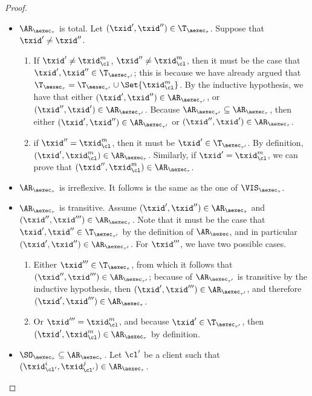 \begin{proof}
\begin{itemize}
\begin{itemize}
\item $\AR_{\aexec_{\tau}}$ is total. Let $(\txid', \txid'') \in \T_{\aexec_{\tau}}$. 
Suppose that $\txid' \neq \txid''$.
\begin{enumerate}
\item If $\txid' \neq 
\txid_{\cl}^{m}$, $\txid'' \neq \txid_{\cl}^{m}$, then it must be the case that $\txid', \txid'' \in \T_{\aexec_{\tau'}}$; 
this is because we have already argued that $\T_{\aexec_{\tau}} = \T_{\aexec_{\tau'}} \cup \Set{\txid_{\cl}^{m}}$. 
By the inductive hypothesis, we have that either $(\txid', \txid'') \in \AR_{\aexec_{\tau'}}$, or 
$(\txid'', \txid') \in \AR_{\aexec_{\tau'}}$. Because $\AR_{\aexec_{\tau'}} \subseteq \AR_{\aexec_{\tau}}$, 
then either $(\txid', \txid'') \in \AR_{\aexec_{\tau'}}$ or $(\txid'', \txid') \in \AR_{\aexec_{\tau}}$. 
\item if $\txid'' = \txid_{\cl}^{m}$, then it must be $\txid' \in \T_{\aexec_{\tau'}}$. By definition, 
$(\txid', \txid_{\cl}^{m}) \in \AR_{\aexec_{\tau}}$. Similarly, if $\txid' = \txid_{\cl}^{m}$, we 
can prove that $(\txid'', \txid_{\cl}^{m}) \in \AR_{\aexec_{\tau}}$.
\end{enumerate}
\item  $\AR_{\aexec_{\tau}}$ is irreflexive. It follows is the same as the one of $\VIS_{\aexec_{\tau}}$.
\item \( \AR_{\aexec_{\tau}} \) is transitive.
Assume $(\txid', \txid'') \in \AR_{\aexec_{\tau}}$ and $(\txid'', \txid''') \in \AR_{\aexec_{\tau}}$. 
Note that it must be the case that $\txid', \txid'' \in \T_{\aexec_{\tau'}}$ by the definition of 
$\AR_{\aexec}$, and in particular $(\txid', \txid'') \in \AR_{\aexec_{\tau'}}$. 
For $\txid'''$, we have two possible cases. 
\begin{enumerate}
\item Either $\txid''' \in \T_{\aexec_{\tau}}$, from 
which it follows that $(\txid'', \txid''') \in \AR_{\aexec_{\tau'}}$; because
of $\AR_{\aexec_{\tau'}}$ is transitive by the inductive hypothesis, then 
$(\txid', \txid''') \in \AR_{\aexec_{\tau'}}$, and therefore $(\txid' ,\txid''') \in 
\AR_{\aexec_{\tau}}$.
\item Or $\txid''' = \txid_{\cl}^{m}$, and because $\txid' \in \T_{\aexec_{\tau'}}$, then 
$(\txid', \txid_{\cl}^{m}) \in \AR_{\aexec_{\tau}}$ by definition. 
\end{enumerate}
\item \( \SO_{\aexec_{\tau}} \subseteq \AR_{\aexec_{\tau}} \).
Let $\cl'$ be a client such that $(\txid_{\cl'}^{i}, \txid_{\cl'}^{j}) \in \AR_{\aexec_{\tau}}$. 

\end{itemize}
\end{itemize}
\end{proof}

